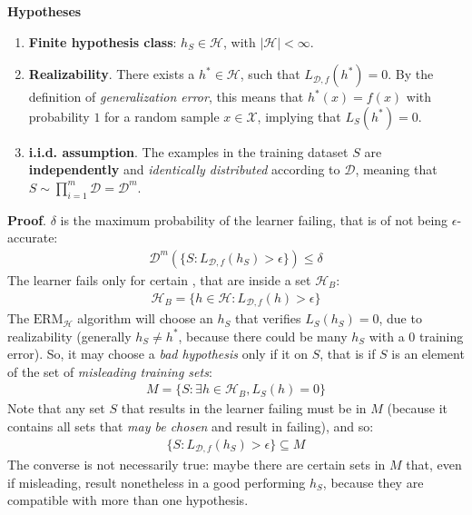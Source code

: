 \documentclass[../template.tex]{subfiles}
\begin{document}
\textbf{Hypotheses}
\begin{enumerate}
    \item \textbf{Finite hypothesis class}: $h_S \in \mathcal{H}$, with $|\mathcal{H}| < \infty$.
    \item \textbf{Realizability}. There exists a  $h^* \in \mathcal{H}$, such that $L_{\mathcal{D}, f}(h^*) = 0$. By the definition of \textit{generalization error}, this means that $h^*(x) = f(x)$ with probability $1$ for a random sample $x \in \mathcal{X}$, implying that $L_S(h^*) = 0$.
    \item \textbf{i.i.d. assumption}. The examples in the training dataset $S$ are \textbf{independently} and \textit{identically distributed} according to $\mathcal{D}$, meaning that $S \sim \prod_{i=1}^m \mathcal{D}= \mathcal{D}^m$.    
\end{enumerate}
 

\textbf{Proof}. $\delta$ is the maximum probability of the learner failing, that is of not being $\epsilon$-accurate:
\begin{align*}
     \mathcal{D}^m(\{S \colon L_{\mathcal{D},f} (h_S) > \epsilon \}) \leq \delta
\end{align*}
The learner fails only for certain , that are inside a set $\mathcal{H}_B$:
\begin{align*}
    \mathcal{H}_B = \{h \in \mathcal{H}\colon L_{\mathcal{D},f}(h) > \epsilon\}
\end{align*}
The $\mathrm{ERM}_{\mathcal{H}}$ algorithm will choose an $h_S$ that verifies $L_S(h_S) = 0$, due to realizability (generally $h_S \neq h^*$, because there could be many $h_S$ with a $0$ training error). So, it may choose a \textit{bad hypothesis} only if it  on $S$, that is if $S$ is an element of the set of \textit{misleading training sets}: 
\begin{align*}
    M = \{S \colon \exists h \in \mathcal{H}_B, L_S(h) = 0 \}
\end{align*}   
Note that any set $S$ that results in the learner failing must be in $M$ (because it contains all sets that \textit{may be chosen} and result in failing), and so:
\begin{align*}
    \{S\colon L_{\mathcal{D},f}(h_S) > \epsilon\} \subseteq M
\end{align*}
The converse is not necessarily true: maybe there are certain sets in $M$ that, even if misleading, result nonetheless in a good performing $h_S$, because they are compatible with more than one hypothesis.
\end{document}
